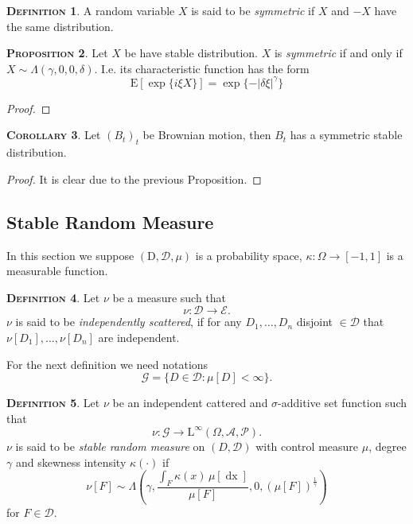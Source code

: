\documentclass[a4paper, twoside, 11pt]{article}
\theoremstyle{definition}
\newtheorem{definition}{\scshape Definition}[section]
\newtheorem{proposition}[definition]{\scshape Proposition}
\newtheorem{corollary}[definition]{\scshape Corollary}
\newcommand{\brkt}[1]{\left({#1} \right)}
\begin{document}
\begin{definition}
  A random variable $X$ is said to be \emph{symmetric} if $X$ and $-X$ have the same distribution.
\end{definition}

\begin{proposition}
  Let $X$ be have stable distribution. $X$ is  \emph{symmetric} if and only if $X \sim \Lambda(\gamma, 0, 0, \delta)$. I.e. its characteristic function has the form
  \begin{equation}
	\mathrm{E}[\exp\{i \xi X\}] = \exp\{-|\delta\xi|^\gamma\}
  \end{equation}
\end{proposition}
\begin{proof}
  
\end{proof}

\begin{corollary}
  Let $(B_t)_t$ be Brownian motion, then $B_t$ has a symmetric stable distribution.
\end{corollary}
\begin{proof}
  It is clear due to the previous Proposition.
\end{proof}


\subsection{Stable Random Measure}
In this section we suppose $(\mathrm{D}, \mathscr{D}, \mu)$ is a probability space, $\kappa : \Omega \rightarrow [-1, 1]$ is a measurable function.
\begin{definition}
	Let $\nu$ be a measure such that
	\begin{equation}
	  \nu : \mathscr{D} \rightarrow \mathscr{E}.\nonumber
	\end{equation}
	$\nu$ is said to be \emph{independently scattered}, if for any $D_1,\dots, D_n$ disjoint $\in \mathscr{D}$ that $\nu[D_1], \dots, \nu[D_n]$ are independent.
\end{definition}

For the next definition we need notations
\begin{equation}
  \mathscr{G} = \{D \in \mathscr{D} : \mu[D] < \infty \}.
\end{equation}
\begin{definition}
  Let $\nu$ be an independent cattered and $\sigma$-additive set function such that
\begin{equation*}
  \nu: \mathscr{G}  \rightarrow \mathrm{L}^{\infty}(\Omega, \mathscr{A}, \mathcal{P}). 
\end{equation*}
$\nu$ is said to be \emph{stable random measure} on $(D, \mathscr{D})$ with control measure $\mu$, degree $\gamma$ and skewness intensity $\kappa(\cdot)$ if 
\begin{equation}
  \nu[F] \sim \Lambda\brkt{\gamma, \frac{\int_F \kappa(x)\, \mu[\mathop{dx}]}{\mu[F]}, 0, (\mu[F])^{\frac{1}{\gamma}}}
\end{equation}
for $F \in \mathscr{D}$.
\end{definition}
\end{document}
